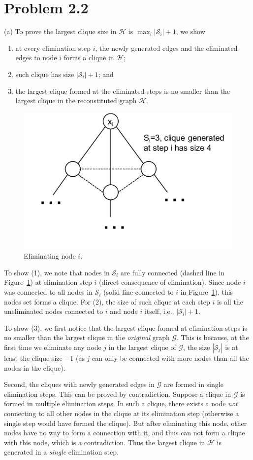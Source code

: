 \documentclass{article}
\begin{document}
 
\section*{Problem 2.2}
%
(a) To prove the largest clique size in $\mathscr{H}$ is $\max_i |\mathscr{S}_i| +1$,
we show 
\begin{enumerate}
	\item at every elimination step $i$, the newly generated edges and the eliminated edges to node $i$ forms a clique in $\mathscr{H}$;
	\item such clique has size $|\mathscr{S}_i| +1$; and
	\item the largest clique formed at the eliminated steps is no smaller than the largest clique in the reconstituted graph $\mathscr{H}$.
\end{enumerate}
%
\begin{figure}[h]
  \centering
  \includegraphics[width=0.5\columnwidth]{2a.pdf}
  \vspace{-0.7cm}
  \caption{Eliminating node $i$.}
  \label{f:2a}
\end{figure}
%

To show (1), we note that nodes in $\mathscr{S}_i$ are fully connected (dashed line in Figure~\ref{f:2a}) at
elimination step $i$ (direct consequence of elimination). Since node $i$ was connected to all nodes in
$\mathscr{S}_i$ (solid line connected to $i$ in Figure~\ref{f:2a}), this nodes set forms a clique.
%
For (2), the size of such clique at each step $i$ is all the uneliminated nodes connected to $i$ and node $i$
itself, i.e., $|\mathscr{S}_i| +1$.

%
To show (3), we first notice that the largest clique formed at elimination steps is no smaller than the largest
clique in the \emph{original} graph $\mathscr{G}$. This is because, at the first time we eliminate any node $j$
in the largest clique of $\mathscr{G}$, the size $|\mathscr{S}_j|$ is at least the clique size $-1$ (as $j$ can
only be connected with more nodes than all the nodes in the clique).

%
Second, the cliques with newly generated edges in $\mathscr{G}$ are formed in single elimination steps. This
can be proved by contradiction. Suppose a clique in $\mathscr{G}$ is formed in multiple elimination steps. In
such a clique, there exists a node \emph{not} connecting to all other nodes in the clique at its elimination
step (otherwise a single step would have formed the clique). But after eliminating this node, other nodes have
no way to form a connection with it, and thus can not form a clique with this node, which is a contradiction.
Thus the largest clique in $\mathscr{H}$ is generated in a \emph{single} elimination step.
\end{document}
